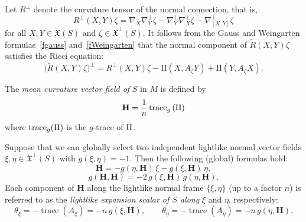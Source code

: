 \documentclass[11pt]{article}
\numberwithin{equation}{section}
\begin{document}
	Let $R^\perp$ denote the curvature tensor of the normal connection, that is,
	\[
	R^\perp(X, Y)\zeta = \nabla_X^\perp \nabla_Y^\perp \zeta - \nabla_Y^\perp \nabla_X^\perp \zeta - \nabla_{[X, Y]}^\perp \zeta
	\]
	for all $X, Y \in \mathfrak{X}(S)$ and $\zeta \in \mathfrak{X}^\perp(S)$. It follows from the Gauss and Weingarten formulas~\eqref{fgauss} and~\eqref{fWeingarten} that the normal component of $\widetilde{R}(X, Y)\zeta$ satisfies the Ricci equation:
	\begin{equation}\label{eq:RicciNormal}
		\bigl(\widetilde{R}(X, Y)\zeta\bigr)^\perp = R^\perp(X, Y)\zeta - \mathrm{II}(X, A_\zeta Y) + \mathrm{II}(Y, A_\zeta X).
	\end{equation}
	
	
	
	The \emph{mean curvature vector field of} $S$ in $M$ is defined by  $$\mathbf{H}=\frac{1}{n}\operatorname{trace}_g \,({\rm II})$$ 
	where $\operatorname{trace}_g({\rm II})$  is the $g$-trace of ${\rm II}$. 
	
	
	
	Suppose that we can globally select two independent lightlike normal vector fields $\xi, \eta \in {\mathfrak X}^\perp(S)$ with $g(\xi, \eta) = -1$. Then the following (global) formulas hold:
	\begin{equation} \label{descomH}
		{\mathbf H} = -g(\eta, {\mathbf H})\, \xi - g(\xi, {\mathbf H})\, \eta,
	\end{equation}
	\begin{equation} \label{HExpansion}
		g({\mathbf H}, {\mathbf H}) = -2\,g(\xi, {\mathbf H})\, g(\eta, {\mathbf H}).
	\end{equation}
	Each component of ${\mathbf H}$ along the lightlike normal frame $\{\xi, \eta\}$ (up to a factor $n$) is referred to as the \emph{lightlike expansion scalar of $S$ along} $\xi$ and $\eta$, respectively:
	\begin{equation}\label{expansion-trace}
		\theta_\xi = -\operatorname{trace}(A_\xi) = -n\, g(\xi, {\mathbf H}), \qquad
		\theta_\eta = -\operatorname{trace}(A_\eta) = -n\, g(\eta, {\mathbf H}).
	\end{equation}
	
\end{document}
